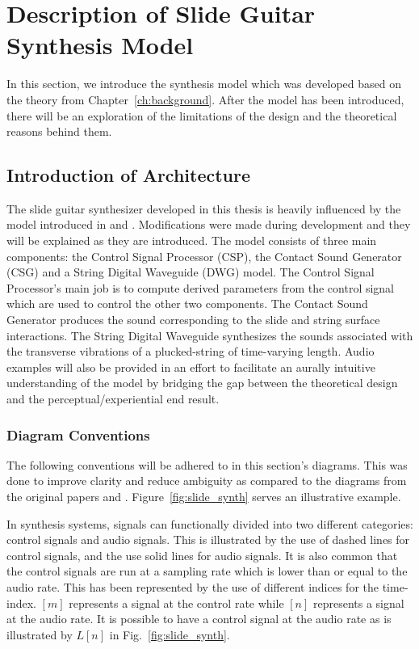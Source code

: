 \documentclass[../main.tex]{subfiles}
\begin{document}
\chapter{Description of Slide Guitar Synthesis Model}
\label{ch:three}
In this section, we introduce the synthesis model which was developed based on the theory from Chapter~\ref{ch:background}. After the model has been introduced, there will be an exploration of the limitations of the design and the theoretical reasons behind them.

\section{Introduction of Architecture}
The slide guitar synthesizer developed in this thesis is heavily influenced by the model introduced in  and . Modifications were made during development and they will be explained as they are introduced. The model consists of three main components: the Control Signal Processor (CSP), the Contact Sound Generator (CSG) and a String Digital Waveguide (DWG) model. The Control Signal Processor's main job is to compute derived parameters from the control signal which are used to control the other two components. The Contact Sound Generator produces the sound corresponding to the slide and string surface interactions. The String Digital Waveguide synthesizes the sounds associated with the transverse vibrations of a plucked-string of time-varying length. Audio examples will also be provided in an effort to facilitate an aurally intuitive understanding of the model by bridging the gap between the theoretical design and the perceptual/experiential end result.

\subsection{Diagram Conventions}
The following conventions will be adhered to in this section's diagrams. This was done to improve clarity and reduce ambiguity as compared to the diagrams from the original papers  and . Figure~\ref{fig:slide_synth} serves an illustrative example.

In synthesis systems, signals can functionally divided into two different categories: control signals and audio signals. This is illustrated by the use of dashed lines for control signals, and the use solid lines for audio signals. It is also common that the control signals are run at a sampling rate which is lower than or equal to the audio rate. This has been represented by the use of different indices for the time-index. $[m]$ represents a signal at the control rate while $[n]$ represents a signal at the audio rate. It is possible to have a control signal at the audio rate as is illustrated by $L[n]$ in Fig.~\ref{fig:slide_synth}.
\end{document}
